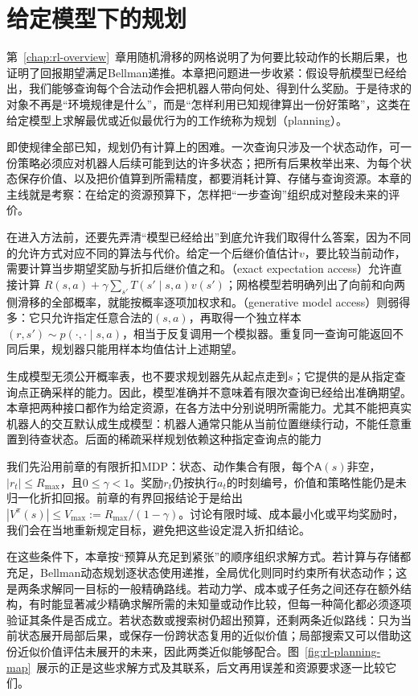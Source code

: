 \chapter{给定模型下的规划}
\label{chap:rl-planning}

第~\ref{chap:rl-overview}~章用随机滑移的网格说明了为何要比较动作的长期后果，也证明了回报期望满足Bellman递推。本章把问题进一步收紧：假设导航模型已经给出，我们能够查询每个合法动作会把机器人带向何处、得到什么奖励。于是待求的对象不再是“环境规律是什么”，而是“怎样利用已知规律算出一份好策略”，这类在给定模型上求解最优或近似最优行为的工作统称为规划（planning）。

即使规律全部已知，规划仍有计算上的困难。一次查询只涉及一个状态动作，可一份策略必须应对机器人后续可能到达的许多状态；把所有后果枚举出来、为每个状态保存价值、以及把价值算到所需精度，都要消耗计算、存储与查询资源。本章的主线就是考察：在给定的资源预算下，怎样把“一步查询”组织成对整段未来的评价。

在进入方法前，还要先弄清“模型已经给出”到底允许我们取得什么答案，因为不同的允许方式对应不同的算法与代价。给定一个后继价值估计$v$，要比较当前动作，需要计算当步期望奖励与折扣后继价值之和。（exact expectation access）允许直接计算
$R(s,a)+\gamma\sum_{s'}T(s'\mid s,a)v(s')$；网格模型若明确列出了向前和向两侧滑移的全部概率，就能按概率逐项加权求和。（generative model access）则弱得多：它只允许指定任意合法的$(s,a)$，再取得一个独立样本$(r,s')\sim p(\cdot,\cdot\mid s,a)$，相当于反复调用一个模拟器。重复同一查询可能返回不同后果，规划器只能用样本均值估计上述期望。

生成模型无须公开概率表，也不要求规划器先从起点走到$s$；它提供的是从指定查询点正确采样的能力。因此，模型准确并不意味着有限次查询已经给出准确期望。本章把两种接口都作为给定资源，在各方法中分别说明所需能力。尤其不能把真实机器人的交互默认成生成模型：机器人通常只能从当前位置继续行动，不能任意重置到待查状态。后面的稀疏采样规划依赖这种指定查询点的能力

我们先沿用前章的有限折扣MDP：状态、动作集合有限，每个$\mathsf A(s)$非空，$|r_t|\leq R_{\max}$，且$0\leq\gamma<1$。奖励$r_t$仍按执行$a_t$的时刻编号，价值和策略性能仍是未归一化折扣回报。前章的有界回报结论于是给出$|V^\pi(s)|\leq V_{\max}:=R_{\max}/(1-\gamma)$。讨论有限时域、成本最小化或平均奖励时，我们会在当地重新规定目标，避免把这些设定混入折扣结论。

在这些条件下，本章按“预算从充足到紧张”的顺序组织求解方式。若计算与存储都充足，Bellman动态规划逐状态使用递推，全局优化则同时约束所有状态动作；这是两条求解同一目标的一般精确路线。若动力学、成本或子任务之间还存在额外结构，有时能显著减少精确求解所需的未知量或动作比较，但每一种简化都必须逐项验证其条件是否成立。若状态数或搜索树仍超出预算，还剩两条近似路线：只为当前状态展开局部后果，或保存一份跨状态复用的近似价值；局部搜索又可以借助这份近似价值评估未展开的未来，因此两类近似能够配合。图~\ref{fig:rl-planning-map}~展示的正是这些求解方式及其联系，后文再用误差和资源要求逐一比较它们。

